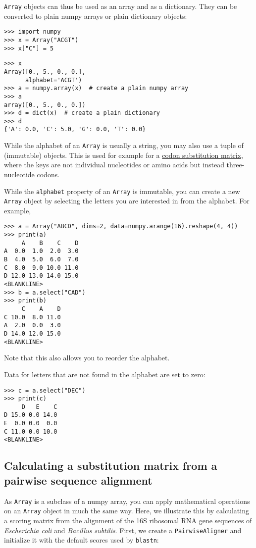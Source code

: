 \verb+Array+ objects can thus be used as an array and as a dictionary. They can be converted to plain numpy arrays or plain dictionary objects:

\begin{verbatim}
>>> import numpy
>>> x = Array("ACGT")
>>> x["C"] = 5
\end{verbatim}
\begin{verbatim}
>>> x
Array([0., 5., 0., 0.],
      alphabet='ACGT')
>>> a = numpy.array(x)  # create a plain numpy array
>>> a
array([0., 5., 0., 0.])
>>> d = dict(x)  # create a plain dictionary
>>> d
{'A': 0.0, 'C': 5.0, 'G': 0.0, 'T': 0.0}
\end{verbatim}

While the alphabet of an \verb+Array+ is usually a string, you may also use a tuple of (immutable) objects. This is used for example for a \hyperlink{codonmatrix}{codon substitution matrix}, where the keys are not individual nucleotides or amino acids but instead three-nucleotide codons.

While the \verb+alphabet+ property of an \verb+Array+ is immutable, you can create a new \verb+Array+ object by selecting the letters you are interested in from the alphabet. For example,
\begin{verbatim}
>>> a = Array("ABCD", dims=2, data=numpy.arange(16).reshape(4, 4))
>>> print(a)
     A    B    C    D
A  0.0  1.0  2.0  3.0
B  4.0  5.0  6.0  7.0
C  8.0  9.0 10.0 11.0
D 12.0 13.0 14.0 15.0
<BLANKLINE>
>>> b = a.select("CAD")
>>> print(b)
     C    A    D
C 10.0  8.0 11.0
A  2.0  0.0  3.0
D 14.0 12.0 15.0
<BLANKLINE>
\end{verbatim}
Note that this also allows you to reorder the alphabet.

Data for letters that are not found in the alphabet are set to zero:
\begin{verbatim}
>>> c = a.select("DEC")
>>> print(c)
     D   E    C
D 15.0 0.0 14.0
E  0.0 0.0  0.0
C 11.0 0.0 10.0
<BLANKLINE>
\end{verbatim}

\subsection{Calculating a substitution matrix from a pairwise sequence alignment}

As \verb+Array+ is a subclass of a numpy array, you can apply mathematical operations on an \verb+Array+ object in much the same way. Here, we illustrate this by calculating a scoring matrix from the alignment of the 16S ribosomal RNA gene sequences of {\it Escherichia coli} and {\it Bacillus subtilis}. First, we create a \verb+PairwiseAligner+ and initialize it with the default scores used by \verb+blastn+:


